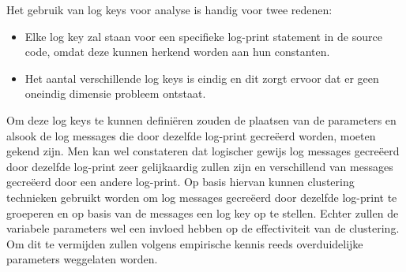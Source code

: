 Het gebruik van log keys voor analyse is handig voor twee redenen: 
\begin{itemize}
    \item Elke log key zal staan voor een specifieke log-print statement in de source code, omdat deze kunnen herkend worden aan hun constanten.
    \item Het aantal verschillende log keys is eindig en dit zorgt ervoor dat er geen oneindig dimensie probleem ontstaat.
\end{itemize}

Om deze log keys te kunnen definiëren zouden de plaatsen van de parameters en alsook de log messages die door dezelfde log-print gecreëerd worden, moeten gekend zijn. Men kan wel constateren dat logischer gewijs log messages gecreëerd door dezelfde log-print zeer gelijkaardig zullen zijn en verschillend van messages gecreëerd door een andere log-print. Op basis hiervan kunnen clustering technieken gebruikt worden om log messages gecreëerd door dezelfde log-print te groeperen en op basis van de messages een log key op te stellen. Echter zullen de variabele parameters wel een invloed hebben op de effectiviteit van de clustering. Om dit te vermijden zullen volgens empirische kennis reeds overduidelijke parameters weggelaten worden. 

